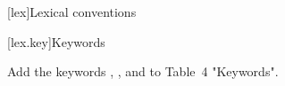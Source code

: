 
[lex]{Lexical conventions}

\setcounter{section}{11}
[lex.key]{Keywords}

Add the keywords , , and
 to Table~4 "Keywords".


